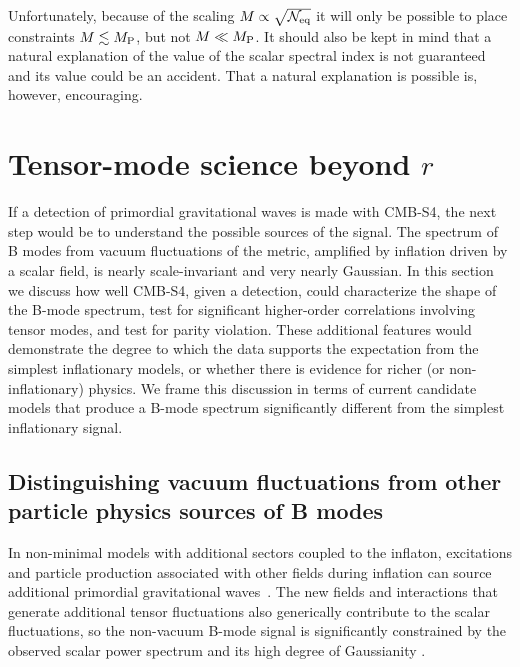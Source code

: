 Unfortunately, because of the scaling $M\propto \sqrt{\mathcal{N}_{\rm eq}}$ it will only be possible to place constraints $M\lesssim M_{\rm P}$, but not $M\ll M_{\rm P}$. It should also be kept in mind that a natural explanation of the value of the scalar spectral index is not guaranteed and its value could be an accident. That a natural explanation is possible is, however, encouraging.

\section{Tensor-mode science beyond $r$}
\label{sec:beyond_r}

If a detection of primordial gravitational waves is made with CMB-S4, the next step would be to understand the possible sources of the signal. The spectrum of B modes from vacuum fluctuations of the metric, amplified by inflation driven by a scalar field, is nearly scale-invariant and very nearly Gaussian. In this section we discuss how well CMB-S4, given a detection, could characterize the shape of the B-mode spectrum, test for significant higher-order correlations involving tensor modes, and test for parity violation. These additional features would demonstrate the degree to which the data supports the expectation from the simplest inflationary models, or whether there is evidence for richer (or non-inflationary) physics. We frame this discussion in terms of current candidate models that produce a B-mode spectrum significantly different from the simplest inflationary signal.  

\subsection{Distinguishing vacuum fluctuations from other particle physics sources of B modes}
In non-minimal models with additional sectors coupled to the inflaton, excitations and particle production associated with other fields during inflation can source additional primordial gravitational waves~\cite{Cook:2011hg,Senatore:2011sp,Barnaby:2012xt}. The new fields and interactions that generate additional tensor fluctuations also generically contribute to the scalar fluctuations, so the non-vacuum B-mode signal is significantly constrained by the observed scalar power spectrum and its high degree of Gaussianity \cite{Barnaby:2012xt,Meerburg:2012id,Ferreira:2014zia,Mirbabayi:2014jqa,Ozsoy:2014sba}. 

